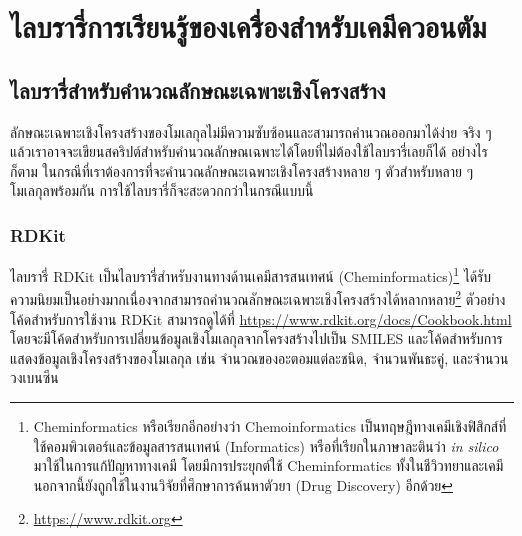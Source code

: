

\chapter{ไลบรารี่การเรียนรู้ของเครื่องสำหรับเคมีควอนตัม}
\label{ch:ml_lib}

\section{ไลบรารี่สำหรับคำนวณลักษณะเฉพาะเชิงโครงสร้าง}
\label{sec:lib_feat}

ลักษณะเฉพาะเชิงโครงสร้างของโมเลกุลไม่มีความซับซ้อนและสามารถคำนวณออกมาได้ง่าย จริง ๆ แล้วเราอาจจะเขียนสคริปต์สำหรับคำนวณลักษณเฉพาะได้โดยที่ไม่ต้องใช้ไลบรารี่เลยก็ได้ อย่างไรก็ตาม ในกรณีที่เราต้องการที่จะคำนวณลักษณะเฉพาะเชิงโครงสร้างหลาย ๆ ตัวสำหรับหลาย ๆ โมเลกุลพร้อมกัน การใช้ไลบรารี่ก็จะสะดวกกว่าในกรณีแบบนี้

\subsection{RDKit}
\label{ssec:rdkit}

ไลบรารี่ RDKit\autocite{rdkit} เป็นไลบรารี่สำหรับงานทางด้านเคมีสารสนเทศน์ (Cheminformatics)\footnote{Cheminformatics หรือเรียกอีกอย่างว่า Chemoinformatics เป็นทฤษฎีทางเคมีเชิงฟิสิกส์ที่ใช้คอมพิวเตอร์และข้อมูลสารสนเทศน์ (Informatics) หรือที่เรียกในภาษาละตินว่า \textit{in silico} มาใช้ในการแก้ปัญหาทางเคมี โดยมีการประยุกต์ใช้ Cheminformatics ทั้งในชีวิวทยาและเคมี นอกจากนี้ยังถูกใช้ในงานวิจัยที่ศึกษาการค้นหาตัวยา (Drug Discovery) อีกด้วย} ได้รับความนิยมเป็นอย่างมากเนื่องจากสามารถคำนวณลักษณะเฉพาะเชิงโครงสร้างได้หลากหลาย\footnote{\url{https://www.rdkit.org}} ตัวอย่างโค้ดสำหรับการใช้งาน RDKit สามารถดูได้ที่ \url{https://www.rdkit.org/docs/Cookbook.html} โดยจะมีโค้ดสำหรับการเปลี่ยนข้อมูลเชิงโมเลกุลจากโครงสร้างไปเป็น SMILES และโค้ดสำหรับการแสดงข้อมูลเชิงโครงสร้างของโมเลกุล เช่น จำนวณของอะตอมแต่ละชนิด, จำนวนพันธะคู่, และจำนวนวงเบนซีน 

